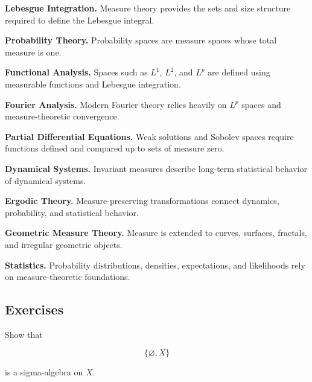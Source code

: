 \begin{applicationbox}
\textbf{Lebesgue Integration.}
Measure theory provides the sets and size structure required to define the
Lebesgue integral.

\medskip

\textbf{Probability Theory.}
Probability spaces are measure spaces whose total measure is one.

\medskip

\textbf{Functional Analysis.}
Spaces such as \(L^1\), \(L^2\), and \(L^p\) are defined using measurable
functions and Lebesgue integration.

\medskip

\textbf{Fourier Analysis.}
Modern Fourier theory relies heavily on \(L^p\) spaces and
measure-theoretic convergence.

\medskip

\textbf{Partial Differential Equations.}
Weak solutions and Sobolev spaces require functions defined and compared
up to sets of measure zero.

\medskip

\textbf{Dynamical Systems.}
Invariant measures describe long-term statistical behavior of dynamical
systems.

\medskip

\textbf{Ergodic Theory.}
Measure-preserving transformations connect dynamics, probability, and
statistical behavior.

\medskip

\textbf{Geometric Measure Theory.}
Measure is extended to curves, surfaces, fractals, and irregular geometric
objects.

\medskip

\textbf{Statistics.}
Probability distributions, densities, expectations, and likelihoods rely
on measure-theoretic foundations.
\end{applicationbox}

\subsection{Exercises}
\label{subsec:measure-theory-exercises}

\begin{exercise}[1]
Show that

\[
\{\varnothing,X\}
\]

is a sigma-algebra on \(X\).
\end{exercise}

